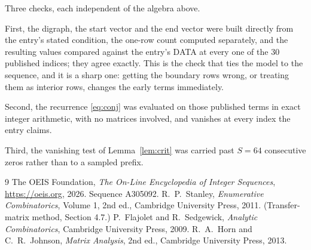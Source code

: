 \documentclass[11pt,a4paper]{article}
\theoremstyle{plain}
\theoremstyle{definition}
\begin{document}
Three checks, each independent of the algebra above.

First, the digraph, the start vector and the end vector were built directly from the
entry's stated condition, the one-row count computed separately, and the resulting values
compared against the entry's DATA at every one of the $30$ published indices; they
agree exactly. This is the check that ties the model to the sequence, and it is a sharp one:
getting the boundary rows wrong, or treating them as interior rows, changes the early terms
immediately.

Second, the recurrence \eqref{eq:conj} was evaluated on those published terms in exact
integer arithmetic, with no matrices involved, and vanishes at every index the entry claims.

Third, the vanishing test of Lemma~\ref{lem:crit} was carried past $S=64$ consecutive
zeros rather than to a sampled prefix.

\begin{thebibliography}{9}
 The OEIS Foundation, \emph{The On-Line Encyclopedia of Integer
Sequences}, \url{https://oeis.org}, 2026. Sequence A305092.
 R.~P.~Stanley, \emph{Enumerative Combinatorics}, Volume 1, 2nd ed.,
Cambridge University Press, 2011. (Transfer-matrix method, Section 4.7.)
 P.~Flajolet and R.~Sedgewick, \emph{Analytic Combinatorics}, Cambridge
University Press, 2009.
 R.~A.~Horn and C.~R.~Johnson, \emph{Matrix Analysis}, 2nd ed., Cambridge
University Press, 2013.
\end{thebibliography}
\end{document}
